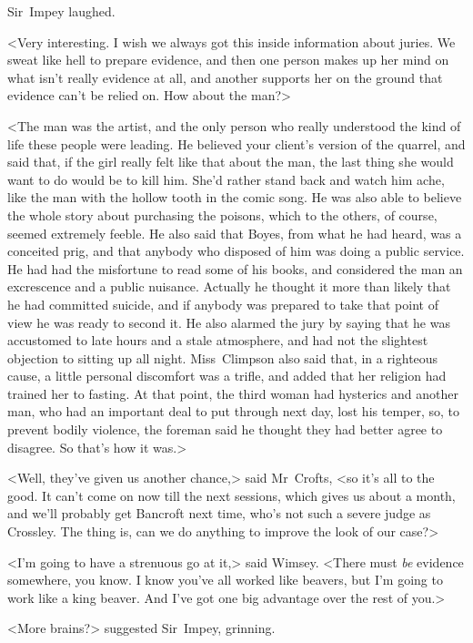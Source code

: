 Sir~Impey laughed.

<Very interesting. I wish we always got this inside information about juries. We sweat like hell to prepare evidence, and then one person makes up her mind on what isn't really evidence at all, and another supports her on the ground that evidence can't be relied on. How about the man?>

<The man was the artist, and the only person who really understood the kind of life these people were leading. He believed your client's version of the quarrel, and said that, if the girl really felt like that about the man, the last thing she would want to do would be to kill him. She'd rather stand back and watch him ache, like the man with the hollow tooth in the comic song. He was also able to believe the whole story about purchasing the poisons, which to the others, of course, seemed extremely feeble. He also said that Boyes, from what he had heard, was a conceited prig, and that anybody who disposed of him was doing a public service. He had had the misfortune to read some of his books, and considered the man an excrescence and a public nuisance. Actually he thought it more than likely that he had committed suicide, and if anybody was prepared to take that point of view he was ready to second it. He also alarmed the jury by saying that he was accustomed to late hours and a stale atmosphere, and had not the slightest objection to sitting up all night. Miss~Climpson also said that, in a righteous cause, a little personal discomfort was a trifle, and added that her religion had trained her to fasting. At that point, the third woman had hysterics and another man, who had an important deal to put through next day, lost his temper, so, to prevent bodily violence, the foreman said he thought they had better agree to disagree. So that's how it was.>

<Well, they've given us another chance,> said Mr~Crofts, <so it's all to the good. It can't come on now till the next sessions, which gives us about a month, and we'll probably get Bancroft next time, who's not such a severe judge as Crossley. The thing is, can we do anything to improve the look of our case?>

<I'm going to have a strenuous go at it,> said Wimsey. <There must \emph{be} evidence somewhere, you know. I know you've all worked like beavers, but I'm going to work like a king beaver. And I've got one big advantage over the rest of you.>

<More brains?> suggested Sir~Impey, grinning.

